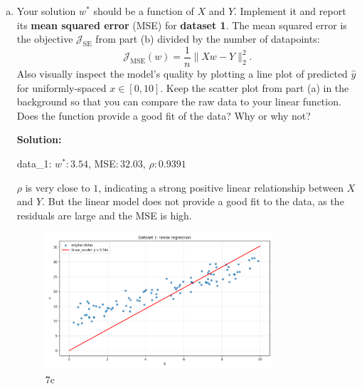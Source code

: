 \documentclass{article}
\newenvironment{solution}{\color{blue} \smallskip \textbf{Solution:}}{}
\begin{document}
\begin{enumerate}[(a)]
    \begin{solution}
        $$\nabla_w \mathcal{J}_\text{SE}(w) = (2(Xw-Y)^\top X)^\top = 2X^\top(Xw-Y)$$
        $$\nabla_w \mathcal{J}_\text{SE}(w^*) = 2X^\top(Xw^*-Y) = \mathbf{0}$$
        $$w^*=\frac{X^\top Y}{X^\top X}$$

        code: hw1\_waz.ipynb
        \[ \qedhere \]
    \end{solution}

    \item 
    Your solution $w^*$ should be a function of $X$ and $Y$. Implement it and report its \textbf{mean squared error} (MSE) for \textbf{dataset 1}. 
    The mean squared error is the objective $\mathcal{J}_\text{SE}$ from part (b) divided by the number of datapoints:
    \[
        \mathcal{J}_\text{MSE}(w) = \frac{1}{n} \| Xw - Y \|_2^2.
    \]
    Also visually inspect the model's quality by plotting a line plot of predicted $\hat{y}$ for uniformly-spaced $x \in [0, 10]$. 
    Keep the scatter plot from part (a) in the background so that you can compare the raw data to your linear function. 
    Does the function provide a good fit of the data? Why or why not?
    
    \begin{solution}  
        
        data\_1: $w^* : 3.54$, MSE$: 32.03$, $\rho : 0.9391$
        
        $\rho$ is very close to $1$, indicating a strong positive linear relationship between $X$ and $Y$. But the linear model does not provide a good fit to the data, as the residuals are large and the MSE is high. 

        \begin{figure}[htbp]
        \centering
        \includegraphics[width=0.8\textwidth]{problem_7c.png} 
        \caption{7c} 
        \label{fig:fig7c} 
        \end{figure}


\end{solution}
\end{enumerate}
\end{document}
